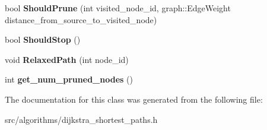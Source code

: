 \begin{DoxyCompactItemize}
\item 
\hypertarget{classall__distance__sketch_1_1SketchDijkstraCallBacks_a1c2d23201506091775260d3873eeee9b}{}bool {\bfseries Should\+Prune} (int visited\+\_\+node\+\_\+id, graph\+::\+Edge\+Weight distance\+\_\+from\+\_\+source\+\_\+to\+\_\+visited\+\_\+node)\label{classall__distance__sketch_1_1SketchDijkstraCallBacks_a1c2d23201506091775260d3873eeee9b}

\item 
\hypertarget{classall__distance__sketch_1_1SketchDijkstraCallBacks_a20140d0e98cd47cebc7ef0be13d8646c}{}bool {\bfseries Should\+Stop} ()\label{classall__distance__sketch_1_1SketchDijkstraCallBacks_a20140d0e98cd47cebc7ef0be13d8646c}

\item 
\hypertarget{classall__distance__sketch_1_1SketchDijkstraCallBacks_a4e75ccd0d9e46735f130601b0fb4d485}{}void {\bfseries Relaxed\+Path} (int node\+\_\+id)\label{classall__distance__sketch_1_1SketchDijkstraCallBacks_a4e75ccd0d9e46735f130601b0fb4d485}

\item 
\hypertarget{classall__distance__sketch_1_1SketchDijkstraCallBacks_a5ed604fcb1b22ac1f819f1b1f2130ad9}{}int {\bfseries get\+\_\+num\+\_\+pruned\+\_\+nodes} ()\label{classall__distance__sketch_1_1SketchDijkstraCallBacks_a5ed604fcb1b22ac1f819f1b1f2130ad9}

\end{DoxyCompactItemize}


The documentation for this class was generated from the following file\+:\begin{DoxyCompactItemize}
\item 
src/algorithms/dijkstra\+\_\+shortest\+\_\+paths.\+h\end{DoxyCompactItemize}
